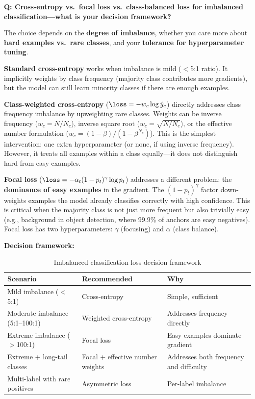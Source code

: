 \begin{interviewq}
\textbf{Q: Cross-entropy vs.\ focal loss vs.\ class-balanced loss for imbalanced classification---what is your decision framework?}

 \quad {} \quad \badgefreq{\freqhigh}

\stronganswer The choice depends on the \textbf{degree of imbalance}, whether you care more about \textbf{hard examples vs.\ rare classes}, and your \textbf{tolerance for hyperparameter tuning}.

\textbf{Standard cross-entropy} works when imbalance is mild ($<$5:1 ratio). It implicitly weights by class frequency (majority class contributes more gradients), but the model can still learn minority classes if there are enough examples.

\textbf{Class-weighted cross-entropy} ($\loss = -w_c \log \hat{y}_c$) directly addresses class frequency imbalance by upweighting rare classes. Weights can be inverse frequency ($w_c = N/N_c$), inverse square root ($w_c = \sqrt{N/N_c}$), or the effective number formulation ($w_c = (1-\beta)/(1-\beta^{N_c})$). This is the simplest intervention: one extra hyperparameter (or none, if using inverse frequency). However, it treats all examples within a class equally---it does not distinguish hard from easy examples.

\textbf{Focal loss} ($\loss = -\alpha_t(1-p_t)^\gamma \log p_t$) addresses a different problem: the \textbf{dominance of easy examples} in the gradient. The $(1-p_t)^\gamma$ factor down-weights examples the model already classifies correctly with high confidence. This is critical when the majority class is not just more frequent but also trivially easy (e.g., background in object detection, where 99.9\% of anchors are easy negatives). Focal loss has two hyperparameters: $\gamma$ (focusing) and $\alpha$ (class balance).

\textbf{Decision framework:}
\begin{table}[H]
\centering
\caption{Imbalanced classification loss decision framework}
\begin{tabularx}{\textwidth}{lXX}
\toprule
\textbf{Scenario} & \textbf{Recommended} & \textbf{Why} \\
\midrule
Mild imbalance ($<$5:1) & Cross-entropy & Simple, sufficient \\
Moderate imbalance (5:1--100:1) & Weighted cross-entropy & Addresses frequency directly \\
Extreme imbalance ($>$100:1) & Focal loss & Easy examples dominate gradient \\
Extreme + long-tail classes & Focal + effective number weights & Addresses both frequency and difficulty \\
Multi-label with rare positives & Asymmetric loss & Per-label imbalance \\
\bottomrule
\end{tabularx}
\end{table}


\end{interviewq}
